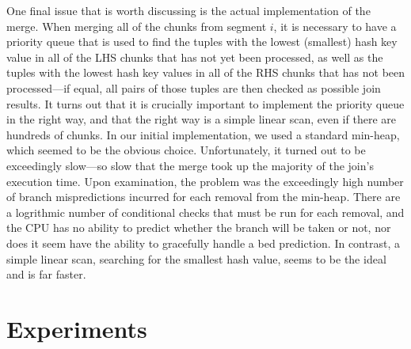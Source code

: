 \documentclass{sig-alternate}
\renewcommand\:{\colon} %
\begin{document}
One final issue that is worth discussing is the actual implementation of the merge.  When merging all of the chunks from segment $i$, it is necessary
to have a priority queue that is used to find the tuples
with the lowest (smallest) hash key value in all of the LHS chunks that has not yet been processed, 
as well as the tuples with the lowest hash key values in all of the RHS chunks that has not been processed---if equal, all pairs of those tuples are
then checked as possible join results.  It turns out that it is crucially important to implement the priority queue in the right way, and that the right
way is a simple linear scan, even if there are hundreds of chunks.  In our initial implementation, we used a standard min-heap, which seemed to be
the obvious choice.  Unfortunately, it turned out to be
exceedingly slow---so slow that the merge took up the majority of the join's execution time.  
Upon examination, the problem was the exceedingly high number of branch mispredictions incurred for each removal from the min-heap.  There are a logrithmic
number of conditional checks that must be run for each removal, and the CPU has no ability to predict whether the branch will be taken or not, nor does
it seem have the ability to gracefully handle a bed prediction.
In contrast, a simple linear scan, searching for the smallest hash value, seems to be the ideal and is far faster.

\section{Experiments}





\balancecolumns
\end{document}
